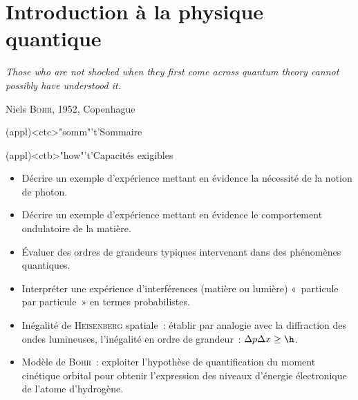 \documentclass[../../main/main.tex]{subfiles}
\begin{document}
\setcounter{chapter}{0}
\chapter{Introduction à la physique quantique}
\label{ch:mecaq}


\epigraph{\openquote\textit{%
		Those who are not shocked when they first come across quantum theory cannot possibly have understood it.
	}%
	\closequote}{Niels \textsc{Bohr}, 1952, Copenhague}

\vspace*{\fill}

\begin{tcn}(appl)<ctc>"somm"'t'{Sommaire}
	\let\item\olditem
	\vspace{-15pt}
	\minitoc
	\vspace{-25pt}
\end{tcn}

\begin{tcn}[sidebyside, fontupper=\small, fontlower=\small](appl)<ctb>"how"'t'{Capacités exigibles}
	\begin{itemize}[label=\rcheck]
		\item Décrire un exemple d'expérience mettant en évidence la nécessité de la
		      notion de photon.

		\item Décrire un exemple d'expérience mettant en évidence le comportement
		      ondulatoire de la matière.

		\item Évaluer des ordres de grandeurs typiques intervenant dans des
		      phénomènes quantiques.

	\end{itemize}
	\tcblower
	\begin{itemize}[label=\rcheck]
		\item Interpréter une expérience d’interférences (matière ou lumière)
		      «~particule par particule~» en termes probabilistes.

		\item Inégalité de \textsc{Heisenberg} spatiale~: établir par analogie avec la
		      diffraction des ondes lumineuses, l’inégalité en ordre de grandeur~:
		      $\Delta{p}\Delta{x} \geq \h$.

		\item Modèle de \textsc{Bohr}~: exploiter l’hypothèse de quantification du
		      moment cinétique orbital pour obtenir l’expression des niveaux d’énergie
		      électronique de l’atome d’hydrogène.

	\end{itemize}
\end{tcn}
\end{document}
